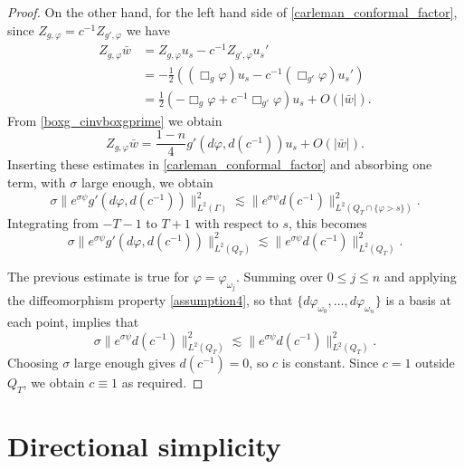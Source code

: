 \documentclass[11pt,letterpaper]{amsart}
\theoremstyle{definition}
\numberwithin{equation}{section}
\newcommand{\norm}[1]{\lVert #1 \rVert}         %
\begin{document}
\begin{proof}
On the other hand, for the left hand side of \eqref{carleman_conformal_factor}, since $Z_{g,\varphi} = c^{-1} Z_{g',\varphi}$ we have 
\begin{align*}
Z_{g,\varphi} \bar{w} &= Z_{g,\varphi} u_s - c^{-1} Z_{g',\varphi} u_s' \\
 &= -\frac{1}{2} ( (\Box_g \varphi) u_s - c^{-1} (\Box_{g'} \varphi) u_s' ) \\
 &= \frac{1}{2} ( -\Box_g \varphi + c^{-1} \Box_{g'} \varphi) u_s + O(|\bar{w}|).
\end{align*}
From \eqref{boxg_cinvboxgprime} we obtain 
\[
Z_{g,\varphi} \bar{w} = \frac{1-n}{4} g'(d\varphi, d(c^{-1})) u_s + O(|\bar{w}|).
\]
Inserting these estimates in \eqref{carleman_conformal_factor} and absorbing one term, with $\sigma$ large enough, we obtain  
\[
\sigma \norm{e^{\sigma \psi} g'(d\varphi, d(c^{-1}))}_{L^2(\Gamma)}^2 \lesssim \norm{e^{\sigma \psi} d(c^{-1})}_{L^2(Q_T \cap \{ \varphi > s \})}^2.
\]
Integrating from $-T-1$ to $T+1$ with respect to $s$, this becomes 
\[
\sigma \norm{e^{\sigma \psi} g'(d\varphi, d(c^{-1}))}_{L^2(Q_T)}^2 \lesssim \norm{e^{\sigma \psi} d(c^{-1})}_{L^2(Q_T)}^2.
\]


The previous estimate is true for $\varphi = \varphi_{\omega_j}$. Summing over $0 \leq j \leq n$ and applying the diffeomorphism property \eqref{assumption4}, so that $\{ d \varphi_{\omega_0}, \ldots, d \varphi_{\omega_n} \}$ is a basis at each point, implies that 
\[
\sigma \norm{e^{\sigma \psi} d(c^{-1})}_{L^2(Q_T)}^2 \lesssim \norm{e^{\sigma \psi} d(c^{-1})}_{L^2(Q_T)}^2.
\]
Choosing $\sigma$ large enough gives $d(c^{-1}) = 0$, so $c$ is constant. Since $c = 1$ outside $Q_T$, we obtain $c \equiv 1$ as required.
\end{proof}





\section{Directional simplicity} \label{sec_directional_simplicity}
\end{document}
